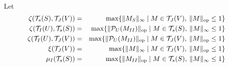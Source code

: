 \documentclass[letterpaper]{article}
\begin{document}
\\

Let 
\begin{eqnarray*}
\zeta(\mathcal{T}_s(S),\mathcal{T}_J(V))&=&\max \{ {\|M_S\|_\infty} \mid M \in \mathcal{T}_J(V), \: \|M\|_{{\rm op}}\leq 1\}\\
\zeta(\mathcal{T}_I(U),\mathcal{T}_s(S))&=&\max \{ {\|\mathcal{P}_{U}(M_{II})\|_{{\rm op}}} \mid M \in \mathcal{T}_s(S), \: \|M\|_{\infty}\leq 1\}\\
\zeta(\mathcal{T}_I(U),\mathcal{T}_J(V))&=&\max \{ {\|\mathcal{P}_{U}(M_{II})\|_{{\rm op}}} \mid  M \in \mathcal{T}_J(V), \: \|M\|_{{\rm op}}\leq 1\}\\
\xi(\mathcal{T}_J(V))&=&\max \{ {\|M\|_\infty} \mid M \in \mathcal{T}_J(V), \: \|M\|_{{\rm op}}\leq 1\}\\
\mu_I(\mathcal{T}_s(S))&=&\max \{ {\|M_{II}\|_{\rm op}} \mid M \in \mathcal{T}_s(S), \: \|M\|_{\infty}\leq 1\}\\
\end{eqnarray*}
\end{document}
